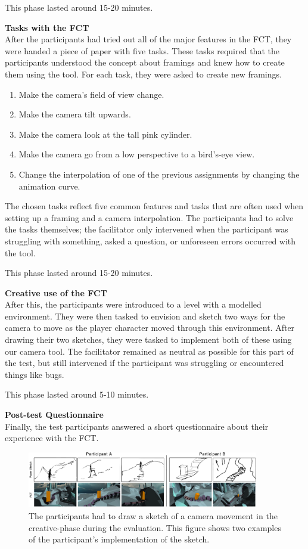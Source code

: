 This phase lasted around 15-20 minutes.

\textbf{Tasks with the FCT}\\
After the participants had tried out all of the major features in the FCT, they were handed a piece of paper with five tasks. These tasks required that the participants understood the concept about framings and knew how to create them using the tool. For each task, they were asked to create new framings.

\begin{enumerate}
\item Make the camera's field of view change.
\item Make the camera tilt upwards.
\item Make the camera look at the tall pink cylinder.
\item Make the camera go from a low perspective to a bird's-eye view.
\item Change the interpolation of one of the previous assignments by changing the animation curve.
\end{enumerate} 

The chosen tasks reflect five common features and tasks that are often used when setting up a framing and a camera interpolation. The participants had to solve the tasks themselves; the facilitator only intervened when the participant was struggling with something, asked a question, or unforeseen errors occurred with the tool.

This phase lasted around 15-20 minutes.

\textbf{Creative use of the FCT}\\
After this, the participants were introduced to a level with a modelled environment. They were then tasked to envision and sketch two ways for the camera to move as the player character moved through this environment. After drawing their two sketches, they were tasked to implement both of these using our camera tool. The facilitator remained as neutral as possible for this part of the test, but still intervened if the participant was struggling or encountered things like bugs.


This phase lasted around 5-10 minutes.

\textbf{Post-test Questionnaire}\\
Finally, the test participants answered a short questionnaire about their experience with the FCT.

\begin{figure}[htbp]
\centering
\includegraphics[width=0.9\textwidth]{Pics/Sketching_FramingsNew}
\caption{The participants had to draw a sketch of a camera movement in the creative-phase during the evaluation. This figure shows two examples of the participant's implementation of the sketch.}
\label{fig:Sketching_Framings}
\end{figure}
